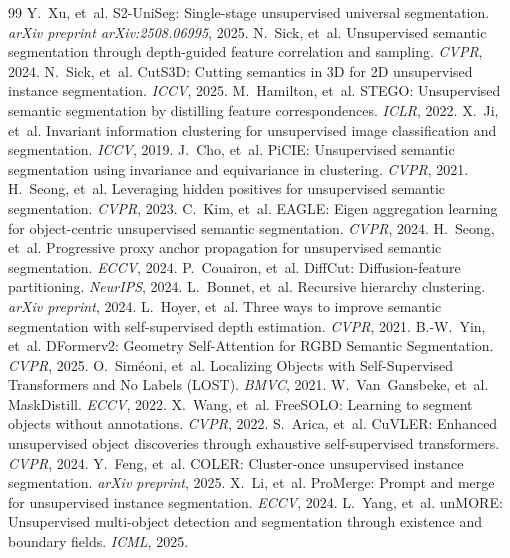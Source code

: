 \documentclass{article}
\begin{document}
\begin{thebibliography}{99}
 Y.~Xu, et~al. S2-UniSeg: Single-stage unsupervised universal segmentation. \emph{arXiv preprint arXiv:2508.06995}, 2025.
 N.~Sick, et~al. Unsupervised semantic segmentation through depth-guided feature correlation and sampling. \emph{CVPR}, 2024.
 N.~Sick, et~al. CutS3D: Cutting semantics in 3D for 2D unsupervised instance segmentation. \emph{ICCV}, 2025.
 M.~Hamilton, et~al. STEGO: Unsupervised semantic segmentation by distilling feature correspondences. \emph{ICLR}, 2022.
 X.~Ji, et~al. Invariant information clustering for unsupervised image classification and segmentation. \emph{ICCV}, 2019.
 J.~Cho, et~al. PiCIE: Unsupervised semantic segmentation using invariance and equivariance in clustering. \emph{CVPR}, 2021.
 H.~Seong, et~al. Leveraging hidden positives for unsupervised semantic segmentation. \emph{CVPR}, 2023.
 C.~Kim, et~al. EAGLE: Eigen aggregation learning for object-centric unsupervised semantic segmentation. \emph{CVPR}, 2024.
 H.~Seong, et~al. Progressive proxy anchor propagation for unsupervised semantic segmentation. \emph{ECCV}, 2024.
 P.~Couairon, et~al. DiffCut: Diffusion-feature partitioning. \emph{NeurIPS}, 2024.
 L.~Bonnet, et~al. Recursive hierarchy clustering. \emph{arXiv preprint}, 2024.
 L.~Hoyer, et~al. Three ways to improve semantic segmentation with self-supervised depth estimation. \emph{CVPR}, 2021.
 B.-W.~Yin, et~al. DFormerv2: Geometry Self-Attention for RGBD Semantic Segmentation. \emph{CVPR}, 2025.
 O.~Sim\'eoni, et~al. Localizing Objects with Self-Supervised Transformers and No Labels (LOST). \emph{BMVC}, 2021.
 W.~Van~Gansbeke, et~al. MaskDistill. \emph{ECCV}, 2022.
 X.~Wang, et~al. FreeSOLO: Learning to segment objects without annotations. \emph{CVPR}, 2022.
 S.~Arica, et~al. CuVLER: Enhanced unsupervised object discoveries through exhaustive self-supervised transformers. \emph{CVPR}, 2024.
 Y.~Feng, et~al. COLER: Cluster-once unsupervised instance segmentation. \emph{arXiv preprint}, 2025.
 X.~Li, et~al. ProMerge: Prompt and merge for unsupervised instance segmentation. \emph{ECCV}, 2024.
 L.~Yang, et~al. unMORE: Unsupervised multi-object detection and segmentation through existence and boundary fields. \emph{ICML}, 2025.

\end{thebibliography}
\end{document}
